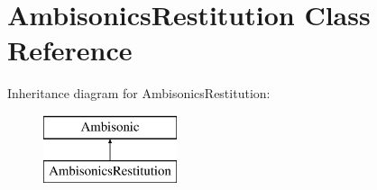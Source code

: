 \hypertarget{class_ambisonics_restitution}{\section{Ambisonics\-Restitution Class Reference}
\label{class_ambisonics_restitution}
}
Inheritance diagram for Ambisonics\-Restitution\-:\begin{figure}[H]
\begin{center}
\leavevmode
\includegraphics[height=2.000000cm]{class_ambisonics_restitution}
\end{center}
\end{figure}
